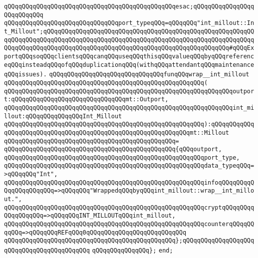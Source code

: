\verb|qQQqqQQqqQQqqQQqqQQqqQQqqQQqqQQqqQQqqQQqqQQqqQQqesac;qQQqqQQqqQQqqQQqqQQqqQQqqQQq|\newline
\newline
\newline
\verb|qQQqqQQqqQQqqQQqqQQqqQQqqQQqqQQqport_typeqQQq=qQQqqQQq"int_millout::Int_Millout";qQQqqQQqqQQqqQQqqQQqqQQqqQQqqQQqqQQqqQQqqQQqqQQqqQQqqQQqqQQqqQQqqQQqqQQqqQQqqQQqqQQqqQQqqQQqqQQqqQQqqQQqqQQqqQQqqQQqqQQqqQQqqQQqqQQqqQQqqQQqqQQqqQQqqQQqqQQqqQQqqQQqqQQqqQQqqQQqqQQqqQQqqQQqqQQq#qQQqExportqQQqsoqQQqclientsqQQqcanqQQquseqQQqthisqQQqvalueqQQqbyqQQqreferenceqQQqinsteadqQQqofqQQqduplicationqQQq(withqQQqattendantqQQqmaintenanceqQQqissues).|\newline
\newline
\verb|qQQqqQQqqQQqqQQqqQQqqQQqqQQqqQQqfunqQQqwrap__int_millout|\newline
\verb|qQQqqQQqqQQqqQQqqQQqqQQqqQQqqQQqqQQqqQQqqQQqqQQqqQQqqQQq(|\newline
\verb|qQQqqQQqqQQqqQQqqQQqqQQqqQQqqQQqqQQqqQQqqQQqqQQqqQQqqQQqqQQqqQQqoutport:qQQqqQQqqQQqqQQqqQQqqQQqqQQqqQQqmt::Outport,|\newline
\verb|qQQqqQQqqQQqqQQqqQQqqQQqqQQqqQQqqQQqqQQqqQQqqQQqqQQqqQQqqQQqqQQqint_millout:qQQqqQQqqQQqqQQqInt_Millout|\newline
\verb|qQQqqQQqqQQqqQQqqQQqqQQqqQQqqQQqqQQqqQQqqQQqqQQqqQQqqQQq):qQQqqQQqqQQqqQQqqQQqqQQqqQQqqQQqqQQqqQQqqQQqqQQqqQQqqQQqqQQqqQQqmt::Millout|\newline
\verb|qQQqqQQqqQQqqQQqqQQqqQQqqQQqqQQqqQQqqQQqqQQqqQQq=|\newline
\verb|qQQqqQQqqQQqqQQqqQQqqQQqqQQqqQQqqQQqqQQqqQQqqQQq{qQQqoutport,|\newline
\verb|qQQqqQQqqQQqqQQqqQQqqQQqqQQqqQQqqQQqqQQqqQQqqQQqqQQqqQQqport_type,|\newline
\verb|qQQqqQQqqQQqqQQqqQQqqQQqqQQqqQQqqQQqqQQqqQQqqQQqqQQqqQQqdata_typeqQQq=>qQQqqQQq"Int",|\newline
\verb|qQQqqQQqqQQqqQQqqQQqqQQqqQQqqQQqqQQqqQQqqQQqqQQqqQQqqQQqinfoqQQqqQQqqQQqqQQqqQQqqQQq=>qQQqqQQq"WrappedqQQqbyqQQqint_millout::wrap__int_millout.",|\newline
\verb|qQQqqQQqqQQqqQQqqQQqqQQqqQQqqQQqqQQqqQQqqQQqqQQqqQQqqQQqcryptqQQqqQQqqQQqqQQqqQQq=>qQQqqQQqINT_MILLOUTqQQqint_millout,|\newline
\verb|qQQqqQQqqQQqqQQqqQQqqQQqqQQqqQQqqQQqqQQqqQQqqQQqqQQqqQQqcounterqQQqqQQqqQQq=>qQQqqQQqREFqQQq0qQQqqQQqqQQqqQQqqQQqqQQqqQQq|\newline
\verb|qQQqqQQqqQQqqQQqqQQqqQQqqQQqqQQqqQQqqQQqqQQqqQQq};qQQqqQQqqQQqqQQqqQQqqQQqqQQqqQQqqQQqqQQqqQQq|\newline
\verb|qQQqqQQqqQQqqQQq};|\newline
\newline
\verb|end;|\newline
\newline
\newline
\newline
\newline

